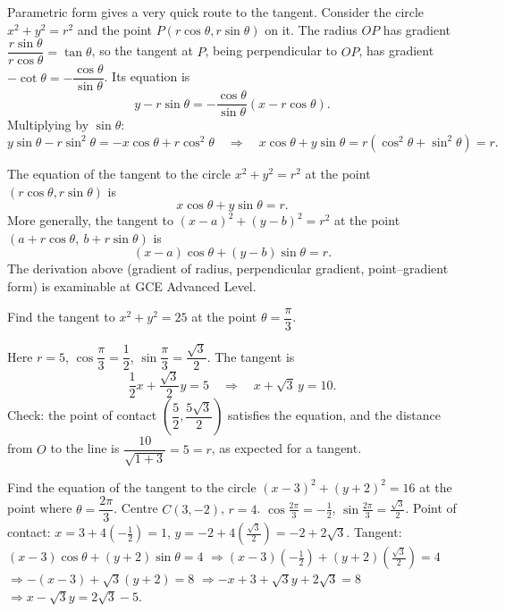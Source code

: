 \documentclass[11pt]{article}
\begin{document}
Parametric form gives a very quick route to the tangent. Consider the circle $x^2 + y^2 = r^2$ and the point $P(r\cos\theta, r\sin\theta)$ on it. The radius $OP$ has gradient $\dfrac{r\sin\theta}{r\cos\theta} = \tan\theta$, so the tangent at $P$, being perpendicular to $OP$, has gradient $-\cot\theta = -\dfrac{\cos\theta}{\sin\theta}$. Its equation is
\[
y - r\sin\theta = -\frac{\cos\theta}{\sin\theta}\left(x - r\cos\theta\right).
\]
Multiplying by $\sin\theta$:
\[
y\sin\theta - r\sin^2\theta = -x\cos\theta + r\cos^2\theta
\quad\Longrightarrow\quad
x\cos\theta + y\sin\theta = r\left(\cos^2\theta + \sin^2\theta\right) = r.
\]

\begin{propriete}
The equation of the tangent to the circle $x^2 + y^2 = r^2$ at the point $(r\cos\theta, r\sin\theta)$ is
\[
x\cos\theta + y\sin\theta = r.
\]
More generally, the tangent to $(x-a)^2 + (y-b)^2 = r^2$ at the point $(a + r\cos\theta,\ b + r\sin\theta)$ is
\[
(x-a)\cos\theta + (y-b)\sin\theta = r.
\]
The derivation above (gradient of radius, perpendicular gradient, point--gradient form) is examinable at GCE Advanced Level.
\end{propriete}

\begin{exemplebox}
Find the tangent to $x^2 + y^2 = 25$ at the point $\theta = \dfrac{\pi}{3}$.

Here $r = 5$, $\cos\dfrac{\pi}{3} = \dfrac12$, $\sin\dfrac{\pi}{3} = \dfrac{\sqrt3}{2}$. The tangent is
\[
\frac{1}{2}x + \frac{\sqrt3}{2}y = 5
\quad\Longrightarrow\quad
x + \sqrt3\,y = 10.
\]
Check: the point of contact $\left(\dfrac52, \dfrac{5\sqrt3}{2}\right)$ satisfies the equation, and the distance from $O$ to the line is $\dfrac{10}{\sqrt{1+3}} = 5 = r$, as expected for a tangent.
\end{exemplebox}

\begin{exemplebox}
Find the equation of the tangent to the circle $(x-3)^2 + (y+2)^2 = 16$ at the point where $\theta = \dfrac{2\pi}{3}$.
\tcblower
Centre $C(3,-2)$, $r=4$. $\cos\frac{2\pi}{3} = -\frac12$, $\sin\frac{2\pi}{3} = \frac{\sqrt3}{2}$.
Point of contact: $x = 3 + 4(-\frac12) = 1$, $y = -2 + 4(\frac{\sqrt3}{2}) = -2 + 2\sqrt3$.
Tangent: $(x-3)\cos\theta + (y+2)\sin\theta = 4$
$\Rightarrow (x-3)(-\frac12) + (y+2)(\frac{\sqrt3}{2}) = 4$
$\Rightarrow -(x-3) + \sqrt3(y+2) = 8$
$\Rightarrow -x + 3 + \sqrt3 y + 2\sqrt3 = 8$
$\Rightarrow x - \sqrt3 y = 2\sqrt3 - 5$.
\end{exemplebox}
\end{document}
